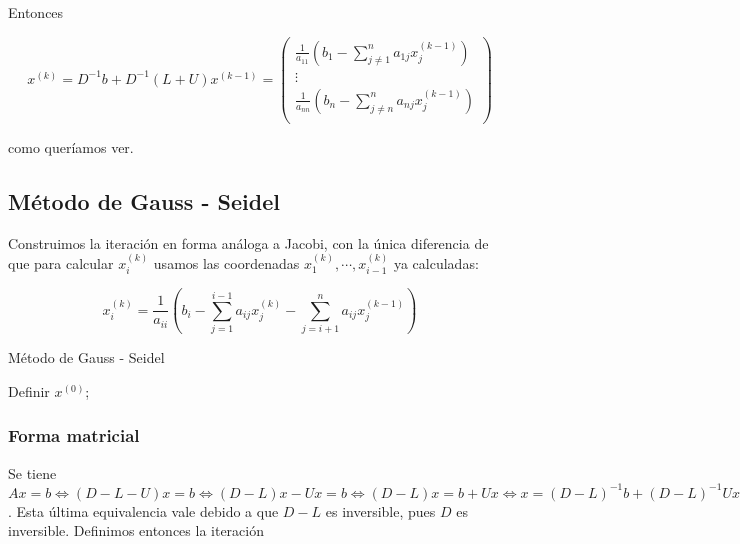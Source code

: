 Entonces 

\[x^{(k)} = D^{-1}b + D^{-1}(L + U)x^{(k - 1)} = 
\begin{pmatrix}
\frac{1}{a_{11}}\left(b_1 - \sum_{j \neq 1}^{n}a_{1j}x_j^{(k - 1)}\right) \\
\vdots \\
\frac{1}{a_{nn}}\left(b_n - \sum_{j \neq n}^{n}a_{nj}x_j^{(k - 1)}\right) \\
\end{pmatrix}\]

como queríamos ver.

\subsection{Método de Gauss - Seidel}

Construimos la iteración en forma análoga a Jacobi, con la única diferencia de que para calcular $x_i^{(k)}$ usamos las coordenadas $x_1^{(k)}, \cdots, x_{i - 1}^{(k)}$ ya calculadas:

\[x_i^{(k)} = \frac{1}{a_{ii}}\left(b_i - \sum_{j = 1}^{i - 1}a_{ij}x_j^{(k)} - \sum_{j = i + 1}^{n} a_{ij}x_j^{(k - 1)}\right)\]

\begin{algorithm}
\caption[]{Método de Gauss - Seidel}
Definir $x^{(0)}$;\\
\end{algorithm}

\subsubsection{Forma matricial}

Se tiene $Ax = b \Leftrightarrow (D - L - U) x = b \Leftrightarrow (D - L)x - Ux = b \Leftrightarrow (D - L)x = b + Ux \Leftrightarrow x = (D - L)^{-1}b + (D - L)^{-1}Ux$. Esta última equivalencia vale debido a que $D - L$ es inversible, pues $D$ es inversible. Definimos entonces la iteración

